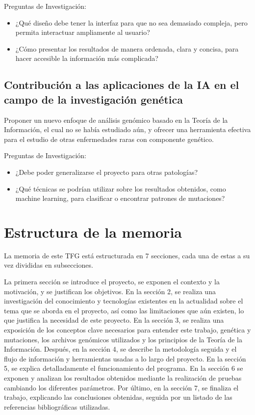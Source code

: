 \documentclass[11pt,spanish,listoffigures,listoftables]{tfgetsinf}
\begin{document}
Preguntas de Investigación: 
\begin{itemize}
\item ¿Qué diseño debe tener la interfaz para que no sea demasiado compleja, pero permita interactuar ampliamente al usuario? 
\item ¿Cómo presentar los resultados de manera ordenada, clara y concisa, para hacer accesible la información más complicada? 
\end{itemize}

\subsection{Contribución a las aplicaciones de la IA en el campo de la investigación genética }

Proponer un nuevo enfoque de análisis genómico basado en la Teoría de la Información, el cual no se había estudiado aún, y ofrecer una herramienta efectiva para el estudio de otras enfermedades raras con componente genético. 

Preguntas de Investigación: 
\begin{itemize}
\item ¿Debe poder generalizarse el proyecto para otras patologías? 
\item ¿Qué técnicas se podrían utilizar sobre los resultados obtenidos, como machine learning, para clasificar o encontrar patrones de mutaciones? 
\end{itemize}


\section{Estructura de la memoria}

La memoria de este TFG está estructurada en 7 secciones, cada una de estas a su vez divididas en subsecciones.  


La primera sección se introduce el proyecto, se exponen el contexto y la motivación, y se justifican los objetivos. En la sección 2, se realiza una investigación del conocimiento y tecnologías existentes en la actualidad sobre el tema que se aborda en el proyecto, así como las limitaciones que aún existen, lo que justifica la necesidad de este proyecto. En la sección 3, se realiza una exposición de los conceptos clave necesarios para entender este trabajo, genética y mutaciones, los archivos genómicos utilizados y los principios de la Teoría de la Información. Después, en la sección 4, se describe la metodología seguida y el flujo de información y herramientas usadas a lo largo del proyecto. En la sección 5, se explica detalladamente el funcionamiento del programa. En la sección 6 se exponen y analizan los resultados obtenidos mediante la realización de pruebas cambiando los diferentes parámetros. Por último, en la sección 7, se finaliza el trabajo, explicando las conclusiones obtenidas, seguida por un listado de las referencias bibliográficas utilizadas. 
\end{document}
